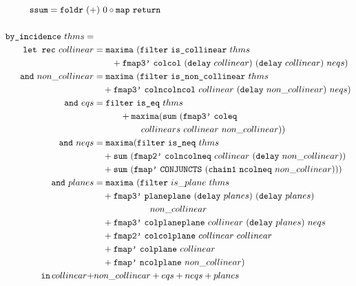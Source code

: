 \begin{figure}
\small
\begin{align*}
&\hspace{-2.55cm}\code{ssum} = \code{foldr}\ (+)\  0\circ \code{map}\ \code{return}\\\\
\code{by\_incidence}\ thms = \\
\quad \code{let rec}\ collinear &= \code{maxima}\ (\code{filter}\ \code{is\_collinear}\ thms\\
&\qquad + \code{fmap3'}\ \code{colcol}\ (\code{delay}\ collinear)\ (\code{delay}\ collinear)\ neqs)\\
\code{and}\ non\_collinear &= \code{maxima}\ (\code{filter}\ \code{is\_non\_collinear}\ thms\\
&\quad + \code{fmap3'}\ \code{colncolncol}\ collinear\ (\code{delay}\ non\_collinear)\ neqs)\\
\code{and}\ eqs &= \code{filter}\ \code{is\_eq}\ thms\\
&\quad\qquad+ \code{maxima} (\code{sum}\ (\code{fmap3'}\ \code{coleq}\\
&\quad\qquad\qquad\ collinears\ collinear\ non\_collinear))\\
\code{and}\ neqs &= \code{maxima} (\code{filter}\ \code{is\_neq}\ thms\\
&\quad + \code{sum}\ (\code{fmap2'}\ \code{colncolneq}\ collinear\ (\code{delay}\ non\_collinear))\\
&\quad + \code{sum}\ (\code{fmap'}\ \code{CONJUNCTS}\ (\code{chain1}\ \code{ncolneq}\ non\_collinear)))\\
\code{and}\ planes &= \code{maxima}\ (\code{filter}\ is\_plane\ thms\\
&\quad + \code{fmap3'}\ \code{planeplane}\ (\code{delay}\ planes)\ (\code{delay}\ planes)\\
&\qquad\qquad\qquad\ non\_collinear\\
&\quad + \code{fmap3'}\ \code{colplaneplane}\ collinear\ (\code{delay}\ planes)\ neqs\\
&\quad+ \code{fmap2'}\ \code{colcolplane}\ collinear\ collinear\\
&\quad+ \code{fmap'}\ \code{colplane}\ collinear\\
&\quad+ \code{fmap'}\ \code{ncolplane}\ non\_collinear)\\
\quad \code{in}\,collinear + &non\_collinear + eqs + neqs + planes

\end{align*}
\end{figure}
